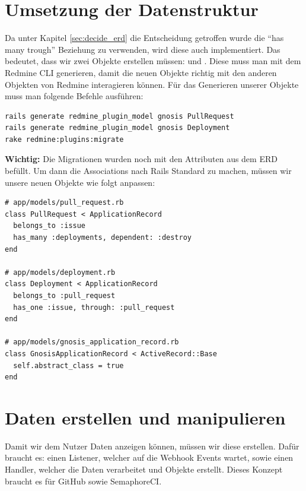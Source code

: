 \section{Umsetzung der Datenstruktur}
Da unter Kapitel \ref{sec:decide_erd} die Entscheidung getroffen wurde die \enquote{has many trough} Beziehung zu
verwenden, wird diese auch implementiert. Das bedeutet, dass wir zwei Objekte erstellen müssen: 
 und . Diese muss man mit dem Redmine CLI generieren,
damit die neuen Objekte richtig mit den anderen Objekten von Redmine interagieren können. Für das Generieren unserer
Objekte muss man folgende Befehle ausführen:
\begin{codebox}[]
  \begin{verbatim}
rails generate redmine_plugin_model gnosis PullRequest 
rails generate redmine_plugin_model gnosis Deployment
rake redmine:plugins:migrate
  \end{verbatim}
\end{codebox}
\textbf{Wichtig:} Die Migrationen wurden noch mit den Attributen aus dem ERD befüllt. \newline
Um dann die Associations nach Rails Standard zu machen, müssen wir unsere neuen Objekte wie folgt anpassen:
\begin{codebox}[]
  \begin{verbatim}
# app/models/pull_request.rb
class PullRequest < ApplicationRecord
  belongs_to :issue
  has_many :deployments, dependent: :destroy
end

# app/models/deployment.rb
class Deployment < ApplicationRecord
  belongs_to :pull_request
  has_one :issue, through: :pull_request
end

# app/models/gnosis_application_record.rb
class GnosisApplicationRecord < ActiveRecord::Base
  self.abstract_class = true
end
  \end{verbatim}
\end{codebox}

\section{Daten erstellen und manipulieren}
Damit wir dem Nutzer Daten anzeigen können, müssen wir diese erstellen. Dafür braucht es: einen Listener, welcher auf
die Webhook Events wartet, sowie einen Handler, welcher die Daten verarbeitet und Objekte erstellt. \newline
Dieses Konzept braucht es für GitHub sowie SemaphoreCI.

